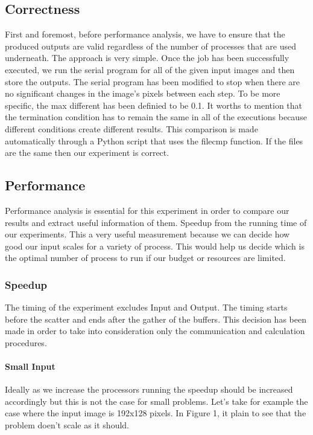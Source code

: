 \documentclass[12pt,a4paper]{article}
\begin{document}
    \subsection{Correctness}        
        First and foremost, before performance analysis, we have to ensure that the produced outputs are valid regardless of the number of processes that are used underneath. The approach is very simple. Once the job has been successfully executed, we run the serial program for all of the given input images and then store the outputs. The serial program has been modified to stop when there are no significant changes in the image's pixels between each step. To be more specific, the max different has been definied to be 0.1. It worths to mention that the termination condition has to remain the same in all of the executions because different conditions create different results. This comparison is made automatically through a Python script that uses the filecmp function. If the files are the same then our experiment is correct.

    \subsection{Performance}
        Performance analysis is essential for this experiment in order to compare our results and extract useful information of them. Speedup from the running time of our experiments. This a very useful measurement because we can decide how good our input scales for a variety of process. This would help us decide which is the optimal number of process to run if our budget or resources are limited.

        \subsubsection{Speedup}
            The timing of the experiment excludes Input and Output. The timing starts before the scatter and ends after the gather of the buffers. This decision has been made in order to take into consideration only the communication and calculation procedures.

            \paragraph{Small Input}
                Ideally as we increase the processors running the speedup should be increased accordingly but this is not the case for small problems. Let's take for example the case where the input image is 192x128 pixels. In Figure 1, it plain to see that the problem doen't scale as it should.
\end{document}
